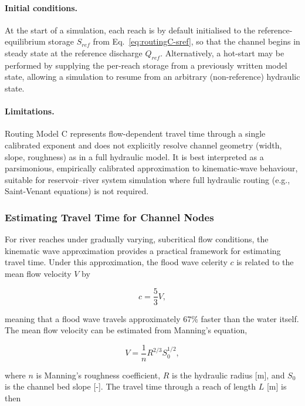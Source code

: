 \documentclass[a4paper, 12pt]{report}
\begin{document}
\paragraph{Initial conditions.}
At the start of a simulation, each reach is by default initialised to the reference-equilibrium
storage $S_{ref}$ from Eq.~\eqref{eq:routingC-sref}, so that the channel begins in steady state at
the reference discharge $Q_{ref}$. Alternatively, a hot-start may be performed by supplying the
per-reach storage from a previously written model state, allowing a simulation to resume from an
arbitrary (non-reference) hydraulic state.

\paragraph{Limitations.}
Routing Model C represents flow-dependent travel time through a single calibrated exponent and
does not explicitly resolve channel geometry (width, slope, roughness) as in a full hydraulic
model. It is best interpreted as a parsimonious, empirically calibrated approximation to
kinematic-wave behaviour, suitable for reservoir--river system simulation where full hydraulic
routing (e.g., Saint-Venant equations) is not required.	
	
\pagebreak 
	
	
	\subsubsection{Estimating Travel Time for Channel Nodes}
	For river reaches under gradually varying, subcritical flow conditions, the kinematic
	wave approximation provides a practical framework for estimating travel time.
	Under this approximation, the flood wave celerity $c$ is related to the mean flow
	velocity $V$ by
	
	\begin{equation}
		c = \frac{5}{3} V,
	\end{equation}
	
	meaning that a flood wave travels approximately 67\% faster than the water itself.
	The mean flow velocity can be estimated from Manning's equation,
	
	\begin{equation}
		V = \frac{1}{n} R^{2/3} S_0^{1/2},
	\end{equation}
	
	where $n$ is Manning's roughness coefficient, $R$ is the hydraulic radius [m], and
	$S_0$ is the channel bed slope [-]. The travel time through a reach of length $L$ [m]
	is then
	
\end{document}
